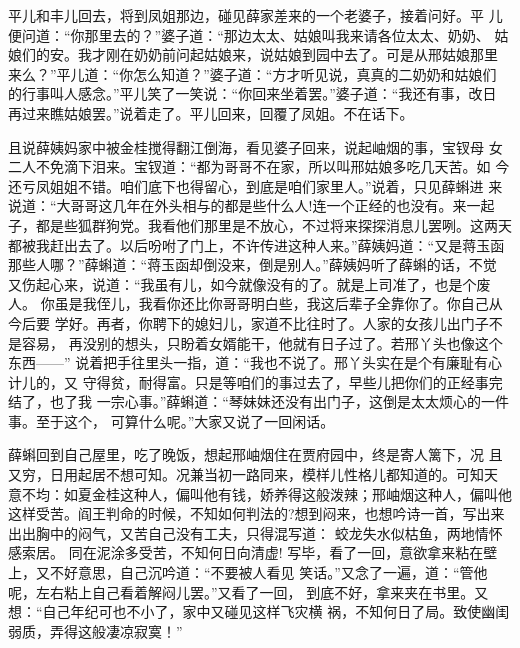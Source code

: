 平儿和丰儿回去，将到凤姐那边，碰见薛家差来的一个老婆子，接着问好。平
儿便问道：“你那里去的？”婆子道：“那边太太、姑娘叫我来请各位太太、奶奶、
姑娘们的安。我才刚在奶奶前问起姑娘来，说姑娘到园中去了。可是从邢姑娘那里
来么？”平儿道：“你怎么知道？”婆子道：“方才听见说，真真的二奶奶和姑娘们
的行事叫人感念。”平儿笑了一笑说：“你回来坐着罢。”婆子道：“我还有事，改日
再过来瞧姑娘罢。”说着走了。平儿回来，回覆了凤姐。不在话下。

且说薛姨妈家中被金桂搅得翻江倒海，看见婆子回来，说起岫烟的事，宝钗母
女二人不免滴下泪来。宝钗道：“都为哥哥不在家，所以叫邢姑娘多吃几天苦。如
今还亏凤姐姐不错。咱们底下也得留心，到底是咱们家里人。”说着，只见薛蝌进
来说道：“大哥哥这几年在外头相与的都是些什么人!连一个正经的也没有。来一起
子，都是些狐群狗党。我看他们那里是不放心，不过将来探探消息儿罢咧。这两天
都被我赶出去了。以后吩咐了门上，不许传进这种人来。”薛姨妈道：“又是蒋玉函
那些人哪？”薛蝌道：“蒋玉函却倒没来，倒是别人。”薛姨妈听了薛蝌的话，不觉
又伤起心来，说道：“我虽有儿，如今就像没有的了。就是上司准了，也是个废人。
你虽是我侄儿，我看你还比你哥哥明白些，我这后辈子全靠你了。你自己从今后要
学好。再者，你聘下的媳妇儿，家道不比往时了。人家的女孩儿出门子不是容易，
再没别的想头，只盼着女婿能干，他就有日子过了。若邢丫头也像这个东西——”
说着把手往里头一指，道：“我也不说了。邢丫头实在是个有廉耻有心计儿的，又
守得贫，耐得富。只是等咱们的事过去了，早些儿把你们的正经事完结了，也了我
一宗心事。”薛蝌道：“琴妹妹还没有出门子，这倒是太太烦心的一件事。至于这个，
可算什么呢。”大家又说了一回闲话。

薛蝌回到自己屋里，吃了晚饭，想起邢岫烟住在贾府园中，终是寄人篱下，况
且又穷，日用起居不想可知。况兼当初一路同来，模样儿性格儿都知道的。可知天
意不均：如夏金桂这种人，偏叫他有钱，娇养得这般泼辣；邢岫烟这种人，偏叫他
这样受苦。阎王判命的时候，不知如何判法的?想到闷来，也想吟诗一首，写出来
出出胸中的闷气，又苦自己没有工夫，只得混写道：
蛟龙失水似枯鱼，两地情怀感索居。
同在泥涂多受苦，不知何日向清虚!
写毕，看了一回，意欲拿来粘在壁上，又不好意思，自己沉吟道：“不要被人看见
笑话。”又念了一遍，道：“管他呢，左右粘上自己看着解闷儿罢。”又看了一回，
到底不好，拿来夹在书里。又想：“自己年纪可也不小了，家中又碰见这样飞灾横
祸，不知何日了局。致使幽闺弱质，弄得这般凄凉寂寞！”

